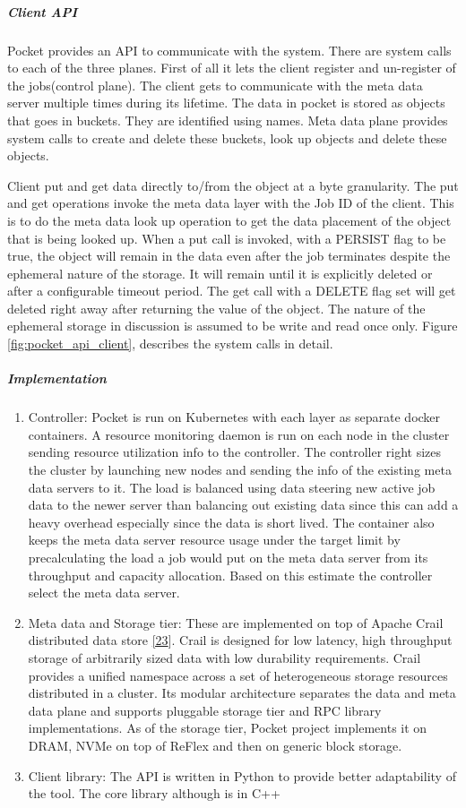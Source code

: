 \documentclass[12pt,titlepage]{article}
\begin{document}
\subparagraph{Client API}
\label{sec:org2afc632}
Pocket provides an API to communicate with the system. There are system calls to
each of the three planes. First of all it lets the client register and un-register of the
jobs(control plane). The client gets to communicate with the meta data server
multiple times during its lifetime. The data in pocket is stored as objects that
goes in buckets. They are identified using names. Meta data plane provides
system calls to create and delete these buckets, look up objects and delete
these objects.

Client put and get data directly to/from the object at a byte granularity. The
put and get operations invoke the meta data layer with the Job ID of the client.
This is to do the meta data look up operation to get the data placement of the
object that is being looked up. When a put call is invoked, with a PERSIST flag
to be true, the object will remain in the data even after the job terminates
despite the ephemeral nature of the storage. It will remain until it is
explicitly deleted or after a configurable timeout period. The get call with a
DELETE flag set will get deleted right away after returning the value of the
object. The nature of the ephemeral storage in discussion is assumed to be write
and read once only. Figure \ref{fig:pocket_api_client}, describes the system calls in detail.

\subparagraph{Implementation}
\label{sec:org4f1c820}
\begin{enumerate}
\item Controller:
\label{sec:orga232928}
Pocket is run on Kubernetes with each layer as separate docker containers. A
resource monitoring daemon is run on each node in the cluster sending resource
utilization info to the controller. The controller right sizes the cluster by
launching new nodes and sending the info of the existing meta data servers to
it. The load is balanced using data steering new active job data to the newer
server than balancing out existing data since this can add a heavy overhead
especially since the data is short lived. The container also keeps the meta data
server resource usage under the target limit by precalculating the load a job
would  put on the meta data server from its throughput and capacity allocation.
Based on this estimate the controller select the meta data server.
\item Meta data and Storage tier:
\label{sec:org6179ed8}
These are implemented on top of Apache Crail distributed data store \hyperref[ref:23]{[23}].
Crail is designed for low latency, high throughput storage of arbitrarily sized
data with low durability requirements. Crail provides a unified namespace across
a set of heterogeneous storage resources distributed in a cluster. Its modular
architecture separates the data and meta data plane and supports pluggable
storage tier and RPC library implementations. As of the storage tier, Pocket
project implements it on DRAM, NVMe on top of ReFlex and then on generic block
storage.
\item Client library:
\label{sec:orgb18bfd2}
The API is written in Python to provide better adaptability of the tool. The
core library although is in C++
\end{enumerate}
\end{document}
